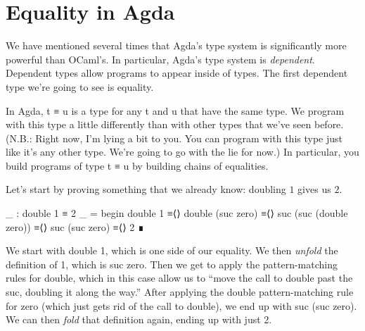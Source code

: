 \documentclass{lecturenotes}
\begin{document}
\pagebreak
\section{Equality in Agda}
\label{sec:equality-agda}

We have mentioned several times that Agda's type system is significantly more powerful than OCaml's.
In particular, Agda's type system is \emph{dependent}.
Dependent types allow programs to appear inside of types.
The first dependent type we're going to see is equality.

In Agda, \textsf{t ≡ u} is a type for any \textsf{t} and \textsf{u} that have the same type.
We program with this type a little differently than with other types that we've seen before.
(N.B.: Right now, I'm lying a bit to you.
You can program with this type just like it's any other type.
We're going to go with the lie for now.)
In particular, you build programs of type \textsf{t ≡ u} by building chains of equalities.

Let's start by proving something that we already know: doubling $1$ gives us $2$.
\begin{center}
\begin{code}
  _ : double 1 ≡ 2
  _ =
    begin
      double 1
    ≡⟨⟩
      double (suc zero)
    ≡⟨⟩
      suc (suc (double zero))
    ≡⟨⟩
      suc (suc zero)
    ≡⟨⟩
      2
    ∎
\end{code}
\end{center}
We start with \textsf{double 1}, which is one side of our equality.
We then \emph{unfold} the definition of \textsf{1}, which is \textsf{suc zero}.
Then we get to apply the pattern-matching rules for double, which in this case allow us to ``move the call to \textsf{double} past the \textsf{suc}, doubling it along the way.''
After applying the double pattern-matching rule for zero (which just gets rid of the call to \textsf{double}), we end up with \textsf{suc (suc zero)}.
We can then \emph{fold} that definition again, ending up with just \textsf{2}.
\end{document}
